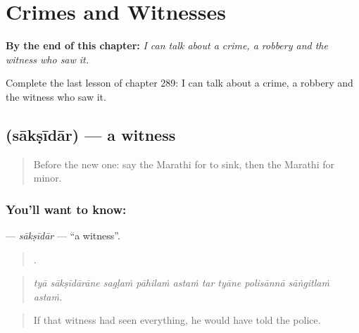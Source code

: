 
\chapter{Crimes and Witnesses}
\label{ch:mr-crimes-and-witnesses}

\begin{chapteropening}
\textbf{By the end of this chapter:} \emph{I can talk about a crime, a robbery and the witness who saw it.}

Complete the last lesson of chapter 289: I can talk about a crime, a robbery and the witness who saw it.
\end{chapteropening}

\section[\texorpdfstring{\mr{साक्षीदार} (sākṣīdār)}{साक्षीदार (sākṣīdār)}]{ (sākṣīdār) — a witness}

\label{lesson:MR-C289-saksidar}



\begin{quote}
Before the new one: say the Marathi for to sink, then the Marathi for minor.
\end{quote}

\subsection*{You'll want to know: }
\textbf{} — \emph{sākṣīdār} — \textquotedblleft{}a witness\textquotedblright{}.

\begin{quote}
         .
\end{quote}

\begin{quote}
\emph{tyā sākṣīdārāne sagḷaṁ pāhilaṁ astaṁ tar tyāne polisānnā sāṅgitlaṁ astaṁ.}
\end{quote}

\begin{quote}
If that witness had seen everything, he would have told the police.
\end{quote}

